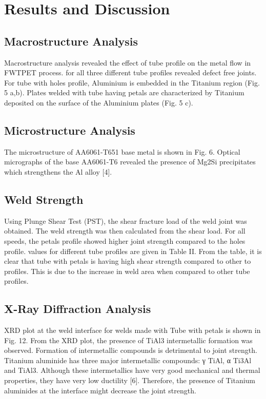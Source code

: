 \documentclass[3p]{elsarticle}
\begin{document}
\section{Results and Discussion}
\label{sec:Results and Discussion}

\subsection{Macrostructure Analysis}
\label{subsec:Macrostructure Analysis}
Macrostructure analysis revealed the effect of tube profile on the metal flow in FWTPET process. for all three different tube profiles revealed defect free joints. For tube with holes profile, Aluminium is embedded in the Titanium region (Fig. 5 a,b). Plates welded with tube having petals are characterized by Titanium deposited on the surface of the Aluminium plates (Fig. 5 c).

\subsection{Microstructure Analysis}
\label{subsec:Macrostructure Analysis}
The microstructure of AA6061-T651 base metal is shown in Fig. 6. Optical micrographs of the base AA6061-T6 revealed the presence of Mg2Si precipitates which strengthens the Al alloy [4].

\subsection{Weld Strength}
\label{subsec:Weld Strength}
Using Plunge Shear Test (PST), the shear fracture load of the weld joint was obtained. The weld strength was then calculated from the shear load. For all speeds, the petals profile showed higher joint strength compared to the holes profile.  values for different tube profiles are given in Table II. From the table, it is clear that tube with petals is having high shear strength compared to other to profiles. This is due to the increase in weld area when compared to other tube profiles.



\subsection{X-Ray Diffraction Analysis}
\label{subsec:XRD-Results}
XRD plot at the weld interface for welds made with Tube with petals is shown in Fig. 12. From the XRD plot, the
presence of TiAl3 intermetallic formation was observed. Formation of intermetallic compounds is detrimental to joint strength. Titanium aluminide has three major intermetallic compounds: γ TiAl, α Ti3Al and TiAl3. Although these intermetallics have very good mechanical and thermal properties, they have very low ductility [6]. Therefore, the presence of Titanium aluminides at the interface might decrease the joint strength.
\end{document}
